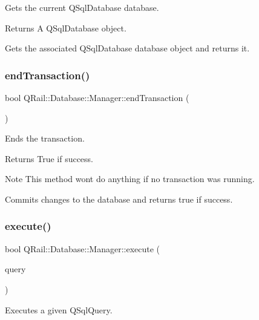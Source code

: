 Gets the current Q\+Sql\+Database database. 

\begin{DoxyReturn}{Returns}
A Q\+Sql\+Database object.
\end{DoxyReturn}
Gets the associated Q\+Sql\+Database database object and returns it. \mbox{\label{classQRail_1_1Database_1_1Manager_a027f3ec1350204386c5328ec8628b276}} 
\subsubsection{\texorpdfstring{endTransaction()}{endTransaction()}}
{\footnotesize\ttfamily bool Q\+Rail\+::\+Database\+::\+Manager\+::end\+Transaction (\begin{DoxyParamCaption}{ }\end{DoxyParamCaption})}



Ends the transaction. 

\begin{DoxyReturn}{Returns}
True if success. 
\end{DoxyReturn}
\begin{DoxyNote}{Note}
This method won\textquotesingle{}t do anything if no transaction was running.
\end{DoxyNote}
Commits changes to the database and returns true if success. \mbox{\label{classQRail_1_1Database_1_1Manager_a80bd96eaa935d721bf0fbec1de6d0862}} 
\subsubsection{\texorpdfstring{execute()}{execute()}}
{\footnotesize\ttfamily bool Q\+Rail\+::\+Database\+::\+Manager\+::execute (\begin{DoxyParamCaption}\item[{Q\+Sql\+Query \&}]{query }\end{DoxyParamCaption})}



Executes a given Q\+Sql\+Query. 



